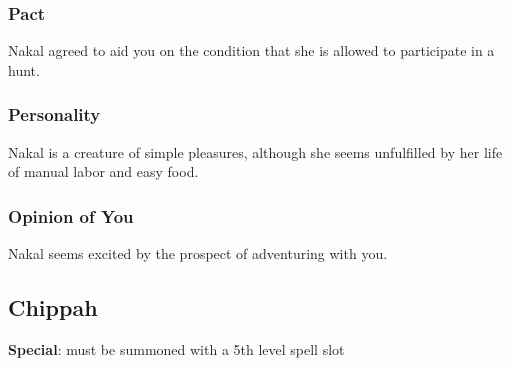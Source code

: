 \documentclass[letterpaper,10pt,twoside,twocolumn,openany]{book}
\begin{document}
\subsubsection{Pact}
Nakal agreed to aid you on the condition that she is allowed to participate in a hunt.

\subsubsection{Personality}
Nakal is a creature of simple pleasures, although she seems unfulfilled by her life of manual labor and easy food.

\subsubsection{Opinion of You}
Nakal seems excited by the prospect of adventuring with you.

\subsection{ Chippah}

\textbf{Special}: must be summoned with a 5th level spell slot
\end{document}
